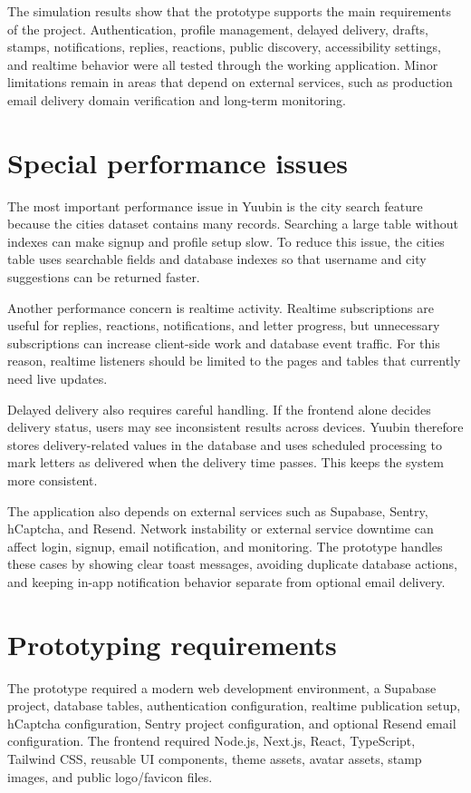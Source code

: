 ﻿\documentclass[12pt,a4paper]{report}
\begin{document}
The simulation results show that the prototype supports the main requirements of the project. Authentication, profile management, delayed delivery, drafts, stamps, notifications, replies, reactions, public discovery, accessibility settings, and realtime behavior were all tested through the working application. Minor limitations remain in areas that depend on external services, such as production email delivery domain verification and long-term monitoring.

\section{Special performance issues}

The most important performance issue in Yuubin is the city search feature because the cities dataset contains many records. Searching a large table without indexes can make signup and profile setup slow. To reduce this issue, the cities table uses searchable fields and database indexes so that username and city suggestions can be returned faster.

Another performance concern is realtime activity. Realtime subscriptions are useful for replies, reactions, notifications, and letter progress, but unnecessary subscriptions can increase client-side work and database event traffic. For this reason, realtime listeners should be limited to the pages and tables that currently need live updates.

Delayed delivery also requires careful handling. If the frontend alone decides delivery status, users may see inconsistent results across devices. Yuubin therefore stores delivery-related values in the database and uses scheduled processing to mark letters as delivered when the delivery time passes. This keeps the system more consistent.

The application also depends on external services such as Supabase, Sentry, hCaptcha, and Resend. Network instability or external service downtime can affect login, signup, email notification, and monitoring. The prototype handles these cases by showing clear toast messages, avoiding duplicate database actions, and keeping in-app notification behavior separate from optional email delivery.

\section{Prototyping requirements}

The prototype required a modern web development environment, a Supabase project, database tables, authentication configuration, realtime publication setup, hCaptcha configuration, Sentry project configuration, and optional Resend email configuration. The frontend required Node.js, Next.js, React, TypeScript, Tailwind CSS, reusable UI components, theme assets, avatar assets, stamp images, and public logo/favicon files.
\end{document}
